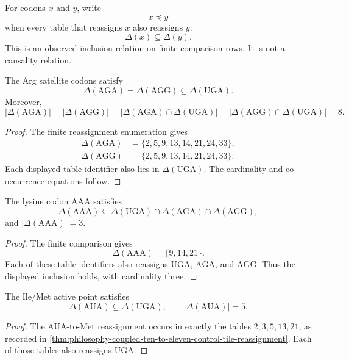 \begin{definition}
\label{def:philosophy-reassignment-set-preorder}
For codons $x$ and $y$, write
$$
  x\preceq y
$$
when every table that reassigns $x$ also reassigns $y$:
$$
  \Delta(x)\subseteq\Delta(y).
$$
This is an observed inclusion relation on finite comparison rows. It is
not a causality relation.
\end{definition}

\begin{theorem}
\label{thm:philosophy-arg-satellite-contained-in-uga}
The Arg satellite codons satisfy
$$
  \Delta(\mathrm{AGA})
  =
  \Delta(\mathrm{AGG})
  \subseteq
  \Delta(\mathrm{UGA}).
$$
Moreover,
$$
  |\Delta(\mathrm{AGA})|
  =
  |\Delta(\mathrm{AGG})|
  =
  |\Delta(\mathrm{AGA})\cap\Delta(\mathrm{UGA})|
  =
  |\Delta(\mathrm{AGG})\cap\Delta(\mathrm{UGA})|
  =
  8.
$$
\end{theorem}
\begin{proof}
The finite reassignment enumeration gives
$$
\begin{aligned}
  \Delta(\mathrm{AGA})
    &=\{2,5,9,13,14,21,24,33\},\\
  \Delta(\mathrm{AGG})
    &=\{2,5,9,13,14,21,24,33\}.
\end{aligned}
$$
Each displayed table identifier also lies in $\Delta(\mathrm{UGA})$.
The cardinality and co-occurrence equations follow.
\end{proof}

\begin{theorem}
\label{thm:philosophy-aaa-deeper-hotspot-event}
The lysine codon $\mathrm{AAA}$ satisfies
$$
  \Delta(\mathrm{AAA})
  \subseteq
  \Delta(\mathrm{UGA})
  \cap
  \Delta(\mathrm{AGA})
  \cap
  \Delta(\mathrm{AGG}),
$$
and $|\Delta(\mathrm{AAA})|=3$.
\end{theorem}
\begin{proof}
The finite comparison gives
$$
  \Delta(\mathrm{AAA})=\{9,14,21\}.
$$
Each of these table identifiers also reassigns $\mathrm{UGA}$,
$\mathrm{AGA}$, and $\mathrm{AGG}$. Thus the displayed inclusion holds,
with cardinality three.
\end{proof}

\begin{theorem}
\label{thm:philosophy-aua-contained-in-uga}
The Ile/Met active point satisfies
$$
  \Delta(\mathrm{AUA})\subseteq\Delta(\mathrm{UGA}),
  \qquad
  |\Delta(\mathrm{AUA})|=5.
$$
\end{theorem}
\begin{proof}
The AUA-to-Met reassignment occurs in exactly the tables
$2,3,5,13,21$, as recorded in
\autoref{thm:philosophy-coupled-ten-to-eleven-control-tile-reassignment}.
Each of those tables also reassigns $\mathrm{UGA}$.
\end{proof}

